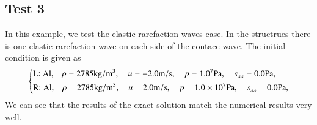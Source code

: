 \documentclass[review]{elsarticle}
\begin{document}
\subsection{Test 3}
In this example, we test the elastic rarefaction waves case. In the structrues there  is one  elastic rarefaction wave on each side of the contace wave. The initial condition is given as
\begin{equation}
 \left\{ \begin{aligned}
	 &	 \text{L: Al,}\quad  \rho = 2785 \text{kg}/\text{m}^3, \quad  u = -2.0\text{m}/\text{s}, \quad  p = 1.0\time 10^7\text{Pa}, \quad  s_{xx}=0.0 \text{Pa},\\
	 &	 \text{R: Al,}\quad  \rho = 2785 \text{kg}/\text{m}^3, \quad  u = 2.0\text{m}/\text{s}, \quad  p = 1.0\times 10^7 \text{Pa}, \quad  s_{xx}=0.0 \text{Pa},\\
   \end{aligned}
 \right.
\end{equation}
We can see that the results of the exact solution match the numerical results very well.
%
\end{document}
